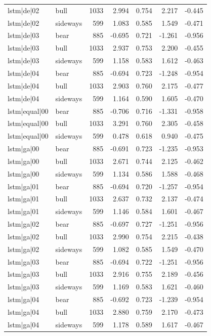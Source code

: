 \begin{table}
\begin{tabular}{llrrrrr}
lstm|de|02 & bull & 1033 & 2.994 & 0.754 & 2.217 & -0.445 \\
lstm|de|02 & sideways & 599 & 1.083 & 0.585 & 1.549 & -0.471 \\
lstm|de|03 & bear & 885 & -0.695 & 0.721 & -1.261 & -0.956 \\
lstm|de|03 & bull & 1033 & 2.937 & 0.753 & 2.200 & -0.455 \\
lstm|de|03 & sideways & 599 & 1.158 & 0.583 & 1.612 & -0.463 \\
lstm|de|04 & bear & 885 & -0.694 & 0.723 & -1.248 & -0.954 \\
lstm|de|04 & bull & 1033 & 2.903 & 0.760 & 2.175 & -0.477 \\
lstm|de|04 & sideways & 599 & 1.164 & 0.590 & 1.605 & -0.470 \\
lstm|equal|00 & bear & 885 & -0.706 & 0.716 & -1.331 & -0.958 \\
lstm|equal|00 & bull & 1033 & 3.291 & 0.760 & 2.305 & -0.458 \\
lstm|equal|00 & sideways & 599 & 0.478 & 0.618 & 0.940 & -0.475 \\
lstm|ga|00 & bear & 885 & -0.691 & 0.723 & -1.235 & -0.953 \\
lstm|ga|00 & bull & 1033 & 2.671 & 0.744 & 2.125 & -0.462 \\
lstm|ga|00 & sideways & 599 & 1.134 & 0.586 & 1.588 & -0.468 \\
lstm|ga|01 & bear & 885 & -0.694 & 0.720 & -1.257 & -0.954 \\
lstm|ga|01 & bull & 1033 & 2.637 & 0.732 & 2.137 & -0.474 \\
lstm|ga|01 & sideways & 599 & 1.146 & 0.584 & 1.601 & -0.467 \\
lstm|ga|02 & bear & 885 & -0.697 & 0.727 & -1.251 & -0.956 \\
lstm|ga|02 & bull & 1033 & 2.990 & 0.754 & 2.215 & -0.438 \\
lstm|ga|02 & sideways & 599 & 1.082 & 0.585 & 1.549 & -0.470 \\
lstm|ga|03 & bear & 885 & -0.694 & 0.722 & -1.251 & -0.956 \\
lstm|ga|03 & bull & 1033 & 2.916 & 0.755 & 2.189 & -0.456 \\
lstm|ga|03 & sideways & 599 & 1.169 & 0.583 & 1.621 & -0.460 \\
lstm|ga|04 & bear & 885 & -0.692 & 0.723 & -1.239 & -0.954 \\
lstm|ga|04 & bull & 1033 & 2.880 & 0.759 & 2.170 & -0.473 \\
lstm|ga|04 & sideways & 599 & 1.178 & 0.589 & 1.617 & -0.467 \\

\end{tabular}
\end{table}
